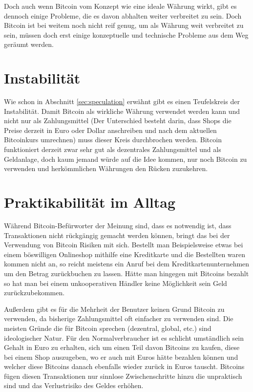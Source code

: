 Doch auch wenn Bitcoin vom Konzept wie eine ideale Währung wirkt, gibt es dennoch einige Probleme, die es davon abhalten weiter verbreitet zu sein.
Doch Bitcoin ist bei weitem noch nicht reif genug, um als Währung weit verbreitet zu sein, müssen doch erst einige konzeptuelle und technische Probleme aus dem Weg geräumt werden.

\section{Instabilität}

Wie schon in Abschnitt \ref{sec:speculation} erwähnt gibt es einen Teufelskreis der Instabilität.
Damit Bitcoin als wirkliche Währung verwendet werden kann und nicht nur als Zahlungsmittel (Der Unterschied besteht darin, dass Shops die Preise derzeit in Euro oder Dollar anschreiben und nach dem aktuellen Bitcoinkurs umrechnen) muss dieser Kreis durchbrochen werden.
Bitcoin funktioniert derzeit zwar sehr gut als dezentrales Zahlungsmittel und als Geldanlage, doch kaum jemand würde auf die Idee kommen, nur noch Bitcoin zu verwenden und herkömmlichen Währungen den Rücken zuzukehren.

\section{Praktikabilität im Alltag}

Während Bitcoin-Befürworter der Meinung sind, dass es notwendig ist, dass Transaktionen nicht rückgängig gemacht werden können, bringt das bei der Verwendung von Bitcoin Risiken mit sich.
Bestellt man Beispielsweise etwas bei einem böswilligen Onlineshop mithilfe eine Kreditkarte und die Bestellten waren kommen nicht an, so reicht meistens ein Anruf bei dem Kreditkartenunternehmen um den Betrag zurückbuchen zu lassen.
Hätte man hingegen mit Bitcoins bezahlt so hat man bei einem unkooperativen Händler keine Möglichkeit sein Geld zurückzubekommen.

Außerdem gibt es für die Mehrheit der Benutzer keinen Grund Bitcoin zu verwenden, da bisherige Zahlungsmittel oft einfacher zu verwenden sind.
Die meisten Gründe die für Bitcoin sprechen (dezentral, global, etc.) sind ideologischer Natur.
Für den Normalverbraucher ist es schlicht umständlich sein Gehalt in Euro zu erhalten, sich um einen Teil davon Bitcoins zu kaufen, diese bei einem Shop auszugeben, wo er auch mit Euros hätte bezahlen können und welcher diese Bitcoins danach ebenfalls wieder zurück in Euros tauscht.
Bitcoins fügen diesen Transaktionen nur sinnlose Zwischenschritte hinzu die unpraktisch sind und das Verlustrisiko des Geldes erhöhen.

